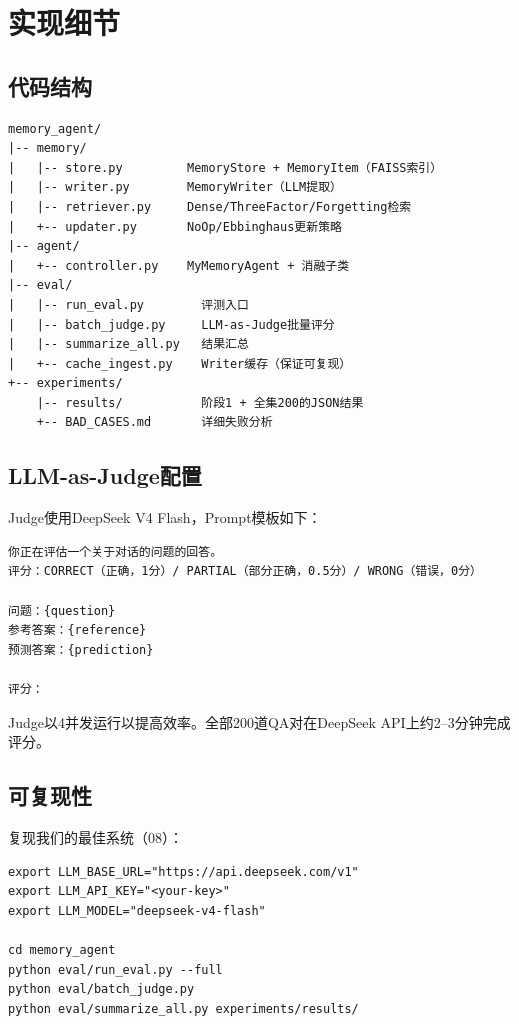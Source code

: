 \documentclass[11pt,a4paper]{ctexart}
\begin{document}
\appendix

\section{实现细节}

\subsection{代码结构}

\begin{verbatim}
memory_agent/
|-- memory/
|   |-- store.py         MemoryStore + MemoryItem（FAISS索引）
|   |-- writer.py        MemoryWriter（LLM提取）
|   |-- retriever.py     Dense/ThreeFactor/Forgetting检索
|   +-- updater.py       NoOp/Ebbinghaus更新策略
|-- agent/
|   +-- controller.py    MyMemoryAgent + 消融子类
|-- eval/
|   |-- run_eval.py        评测入口
|   |-- batch_judge.py     LLM-as-Judge批量评分
|   |-- summarize_all.py   结果汇总
|   +-- cache_ingest.py    Writer缓存（保证可复现）
+-- experiments/
    |-- results/           阶段1 + 全集200的JSON结果
    +-- BAD_CASES.md       详细失败分析
\end{verbatim}

\subsection{LLM-as-Judge配置}

Judge使用DeepSeek V4 Flash，Prompt模板如下：

\begin{verbatim}
你正在评估一个关于对话的问题的回答。
评分：CORRECT（正确，1分）/ PARTIAL（部分正确，0.5分）/ WRONG（错误，0分）

问题：{question}
参考答案：{reference}
预测答案：{prediction}

评分：
\end{verbatim}

Judge以4并发运行以提高效率。全部200道QA对在DeepSeek API上约2--3分钟完成评分。

\subsection{可复现性}

复现我们的最佳系统（08）：

\begin{verbatim}
export LLM_BASE_URL="https://api.deepseek.com/v1"
export LLM_API_KEY="<your-key>"
export LLM_MODEL="deepseek-v4-flash"

cd memory_agent
python eval/run_eval.py --full
python eval/batch_judge.py
python eval/summarize_all.py experiments/results/
\end{verbatim}
\end{document}
